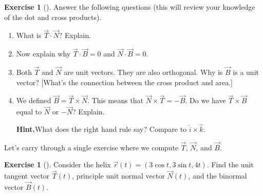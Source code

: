\documentclass[10pt,]{book}
\theoremstyle{plain}
\theoremstyle{definition}
\theoremstyle{definition}
\theoremstyle{definition}
\theoremstyle{definition}
\newtheorem{exploration}[project]{Exercise}
\theoremstyle{definition}
\numberwithin{equation}{section}
\begin{document}
\begin{exploration}[]\label{exploration-176}
Answer the following questions (this will review your knowledge of the dot and cross products).%
\begin{enumerate}[font=\bfseries,label=(\alph*),ref=\alph*]
\item\label{task-439} What is \(\vec T\cdot \vec N\)? Explain.%
\item\label{task-440} Now explain why \(\vec T\cdot \vec B=0\) and \(\vec N\cdot \vec B=0\).%
\item\label{task-441} Both \(\vec T\) and \(\vec N\) are unit vectors. They are also orthogonal. Why is \(\vec B\) is a unit vector? [What's the connection between the cross product and area.]%
\item\label{task-442} We defined \(\vec B=\vec T\times \vec N\). This means that \(\vec N\times \vec T=-\vec B\).  Do we have \(\vec T\times \vec B\) equal to \(\vec N\) or \(-\vec N\)? Explain.%
\par\medskip\noindent%
\textbf{Hint.}\quad What does the right hand rule say? Compare to \(\hat i\times \hat k\).%
\end{enumerate}
\end{exploration}
Let's carry through a single exercise where we compute \(\vec T\), \(\vec N\), and \(\vec B\).%
\begin{exploration}[]\label{helix_example_of_T_N_and_B}
Consider the helix \(\vec r(t) = (3\cos t,3\sin t, 4t)\). Find the unit tangent vector \(\vec T(t)\), principle unit normal vector \(\vec N(t)\), and the binormal vector \(\vec B(t)\).%
\end{exploration}
\typeout{************************************************}
\typeout{************************************************}
\end{document}
